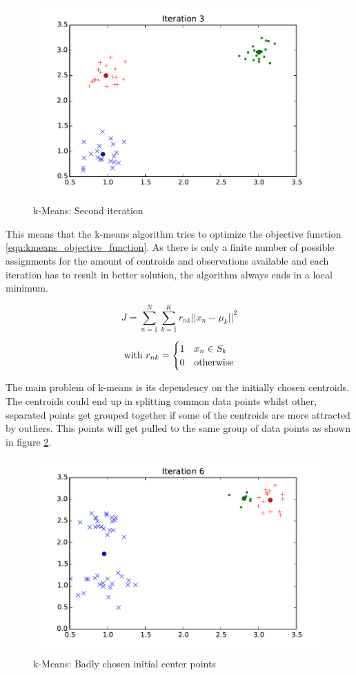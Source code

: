 \begin{figure}
\centering
\includegraphics[width=0.6\linewidth]{img/iteration03}
\caption{k-Means: Second iteration}
\label{fig:kmeans:iteration03}
\end{figure}


This means that the k-means algorithm tries to optimize the objective function \ref{eqn:kmeans_objective_function}. As there is only a finite number of possible assignments for the amount of centroids and observations available and each iteration has to result in better solution, the algorithm always ends in a local minimum.

\begin{equation}
J = \sum_{n=1}^{N} \sum_{k=1}^{K} r_{nk} ||x_n - \mu_k||^2
\label{eqn:kmeans_objective_function}
\end{equation}

\[
\text{with } \\
r_{nk} = \begin{cases}
1 & x_n \in S_k \\
0 & \text{otherwise}
\end{cases}
\]


The main problem of k-means is its dependency on the initially chosen centroids. The centroids could end up in splitting common data points whilst other, separated points get grouped together if some of the centroids are more attracted by outliers. This points will get pulled to the same group of data points as shown in figure \ref{fig:kmeans_bad}.


\begin{figure}[h]
\centering
\includegraphics[width=0.6\linewidth]{img/kmeans_bad}
\caption{k-Means: Badly chosen initial center points}
\label{fig:kmeans_bad}
\end{figure}

